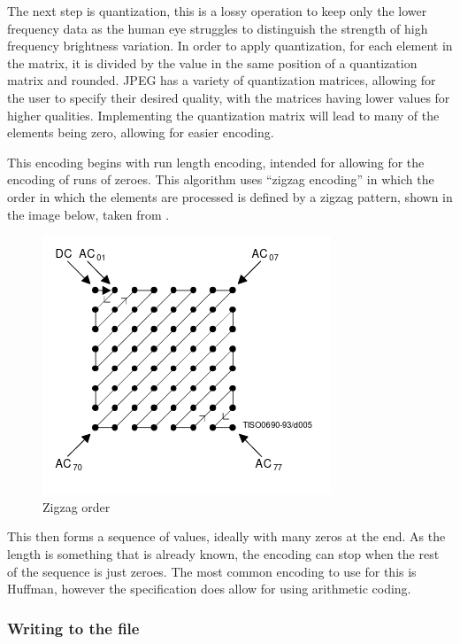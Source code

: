 \documentclass[12pt,a4paper]{article}
\begin{document}

The next step is quantization, this is a lossy operation to keep only the lower frequency data as the human eye struggles to distinguish the strength of high frequency brightness variation. In order to apply quantization, for each element in the matrix, it is divided by the value in the same position of a quantization matrix and rounded. JPEG has a variety of quantization matrices, allowing for the user to specify their desired quality, with the matrices having lower values for higher qualities. Implementing the quantization matrix will lead to many of the elements being zero, allowing for easier encoding.

This encoding begins with run length encoding, intended for allowing for the encoding of runs of zeroes. This algorithm uses “zigzag encoding” in which the order in which the elements are processed is defined by a zigzag pattern, shown in the image below, taken from \cite{jpeg}.

\begin{figure}[H]
    \centering
    \includegraphics{zigzag.png}
    \caption{Zigzag order}
\end{figure}

This then forms a sequence of values, ideally with many zeros at the end. As the length is something that is already known, the encoding can stop when the rest of the sequence is just zeroes. The most common encoding to use for this is Huffman, however the specification does allow for using arithmetic coding.

\subsubsection{Writing to the file}
\end{document}
